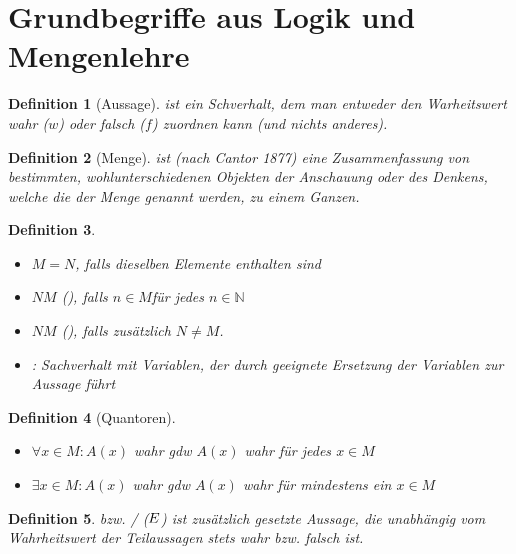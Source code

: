 \documentclass[ngerman,a4paper]{report}
\theoremstyle{break}
\newtheorem*{definition}{Definition}
\begin{document}
	
	
\section{Grundbegriffe aus Logik und Mengenlehre}

\begin{definition}[Aussage]
	 ist ein Schverhalt, dem man entweder den Warheitswert wahr ($w$) oder falsch ($f$) zuordnen kann (und nichts anderes).
\end{definition}

\addtocounter{theorem}{1}
	
\begin{definition}[Menge]
	 ist (nach Cantor 1877) eine Zusammenfassung von bestimmten, wohlunterschiedenen Objekten der Anschauung oder des Denkens, welche die  der Menge genannt werden, zu einem Ganzen.
\end{definition}

\addtocounter{theorem}{1}

\begin{definition}
	\begin{itemize}
		\item $M=N$, falls dieselben Elemente enthalten sind
		\item $N$$M$ (), falls $n\in M$für jedes $n\in\mathbb{N}$
		\item $N$$M$ (), falls zusätzlich $N\neq M$.
		\item {}: Sachverhalt mit Variablen, der durch geeignete Ersetzung der Variablen zur Aussage führt
	\end{itemize}
\end{definition}

\addtocounter{theorem}{1}

\begin{definition}[Quantoren]
	\begin{itemize}
		\item $\forall x\in M: A(x)$ wahr \gls{gdw} $A(x)$ wahr für jedes $x\in M$
		\item $\exists x\in M: A(x)$ wahr \gls{gdw} $A(x)$ wahr für mindestens ein $x\in M$
	\end{itemize}
\end{definition}

\begin{definition}
	 bzw. \slash{} ($\Lightning$) ist zusätzlich gesetzte Aussage, die unabhängig vom Wahrheitswert der Teilaussagen stets wahr bzw. falsch ist.
\end{definition}
\end{document}
